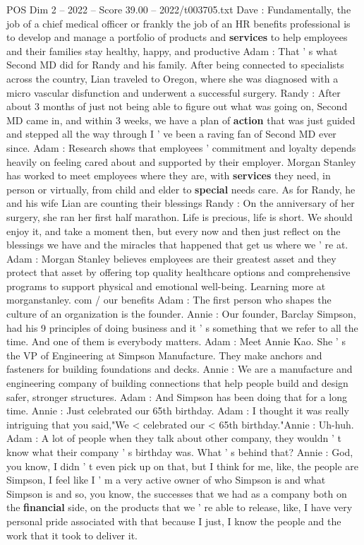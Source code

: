 \begin{textsample}{POS Dim 2 – 2022 – Score 39.00 – 2022/t003705.txt}
Dave : Fundamentally, the job of a chief medical officer or frankly the job of an HR benefits professional is to develop and manage a portfolio of products and \textbf{services} to help employees and their families stay healthy, happy, and productive Adam : That ' s what Second MD did for Randy and his family.
After being connected to specialists across the country, Lian traveled to Oregon, where she was diagnosed with a micro vascular disfunction and underwent a successful surgery.
Randy : After about 3 months of just not being able to figure out what was going on, Second MD came in, and within 3 weeks, we have a plan of \textbf{action} that was just guided and stepped all the way through I ' ve been a raving fan of Second MD ever since.
Adam : Research shows that employees ' commitment and loyalty depends heavily on feeling cared about and supported by their employer.
Morgan Stanley has worked to meet employees where they are, with \textbf{services} they need, in person or virtually, from child and elder to \textbf{special} needs care.
As for Randy, he and his wife Lian are counting their blessings Randy : On the anniversary of her surgery, she ran her first half marathon.
Life is precious, life is short.
We should enjoy it, and take a moment then, but every now and then just reflect on the blessings we have and the miracles that happened that get us where we ' re at.
Adam : Morgan Stanley believes employees are their greatest asset and they protect that asset by offering top quality healthcare options and comprehensive programs to support physical and emotional well-being.
Learning more at morganstanley. com / our benefits Adam : The first person who shapes the culture of an organization is the founder.
Annie : Our founder, Barclay Simpson, had his 9 principles of doing business and it ' s something that we refer to all the time.
And one of them is everybody matters.
Adam : Meet Annie Kao.
She ' s the VP of Engineering at Simpson Manufacture.
They make anchors and fasteners for building foundations and decks.
Annie : We are a manufacture and engineering company of building connections that help people build and design safer, stronger structures.
Adam : And Simpson has been doing that for a long time.
Annie : Just celebrated our 65th birthday.
Adam : I thought it was really intriguing that you said,"We < celebrated our < 65th birthday."Annie : Uh-huh.
Adam : A lot of people when they talk about other company, they wouldn ' t know what their company ' s birthday was.
What ' s behind that?
Annie : God, you know, I didn ' t even pick up on that, but I think for me, like, the people are Simpson, I feel like I ' m a very active owner of who Simpson is and what Simpson is and so, you know, the successes that we had as a company both on the \textbf{financial} side, on the products that we ' re able to release, like, I have very personal pride associated with that because I just, I know the people and the work that it took to deliver it.

\end{textsample}
